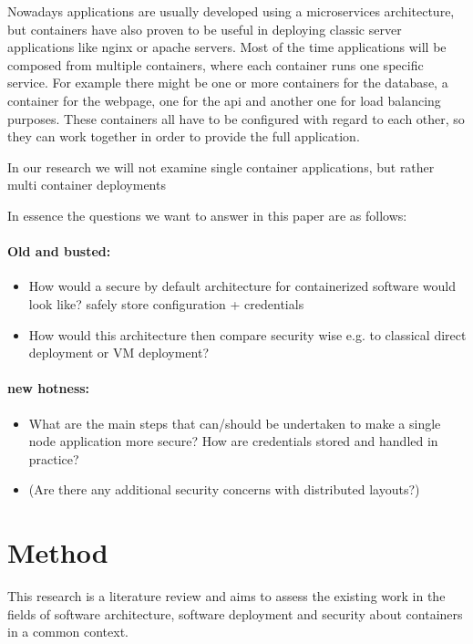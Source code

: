 \documentclass[conference]{IEEEtran}
\begin{document}
Nowadays applications are usually developed using a microservices architecture, but containers have also proven to be useful in deploying classic server applications like nginx or apache servers.
Most of the time applications will be composed from multiple containers, where each container runs one specific service. For example there might be one or more containers for the database, a container for the webpage, one for the api and another one for load balancing purposes. These containers all have to be configured with regard to each other, so they can work together in order to provide the full application.

In our research we will not examine single container applications, but rather multi container deployments

In essence the questions we want to answer in this paper are as follows:

\paragraph{Old and busted:}

\begin{itemize}
\item How would a secure by default architecture for containerized software would look like?
	\subitem safely store configuration + credentials
\item How would this architecture then compare security wise e.g. to classical direct deployment or VM deployment?
\end{itemize}

\paragraph{new hotness:}

\begin{itemize}
\item What are the main steps that can/should be undertaken to make a single node application more secure?
	\subitem How are credentials stored and handled in practice?
\item (Are there any additional security concerns with distributed layouts?)
\end{itemize}

\section{Method}

This research is a literature review and aims to assess the existing work in the fields of software architecture, software deployment and security about containers in a common context.
\end{document}

